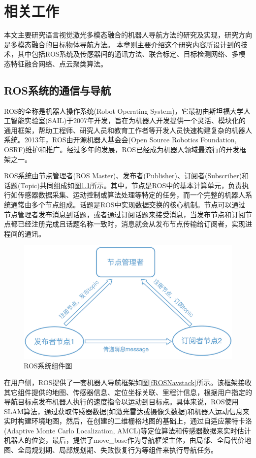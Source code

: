 \chapter{相关工作}

本文主要研究语言视觉激光多模态融合的机器人导航方法的研究及实现，研究方向是多模态融合的目标物体导航方法。
本章则主要介绍这个研究内容所设计到的技术，其中包括ROS系统及传感器间的通讯方法、联合标定、目标检测网络、多模态特征融合网络、点云聚类算法。


\section{ROS系统的通信与导航}
ROS的全称是机器人操作系统(Robot Operating System)，它最初由斯坦福大学人工智能实验室(SAIL)于2007年开发，旨在为机器人开发提供一个灵活、模块化的通用框架，帮助工程师、研究人员和教育工作者等开发人员快速构建复杂的机器人系统。2013年，ROS由开源机器人基金会(Open Source Robotics Foundation, OSRF)维护和推广。经过多年的发展，ROS已经成为机器人领域最流行的开发框架之一。

ROS系统由节点管理者(ROS Master)、发布者(Publisher)、订阅者(Subscriber)和话题(Topic)共同组成如图\ref{frossystem}所示。其中，节点是ROS中的基本计算单元，负责执行如传感器数据采集、运动控制或算法处理等特定的任务，而一个完整的机器人系统通常由多个节点组成。话题是ROS中实现数据交换的核心机制。节点可以通过节点管理者发布消息到话题，或者通过订阅话题来接受消息，当发布节点和订阅节点都已经注册完成且话题名称一致时，消息就会从发布节点传输给订阅者，实现进程间的通讯。

\begin{figure}[htbp]
    \centering
    \includegraphics[scale=0.80]{Fig/rossystem.png}
    \caption{\label{frossystem}ROS系统组件图}
\end{figure}

在用户侧，ROS提供了一套机器人导航框架如图\ref{fROSNavstack}所示。该框架接收其它组件提供的地图、传感器信息、定位坐标关联、里程计信息，根据用户指定的导航目标点发布机器人执行的速度指令以运动到目标点。具体来说，ROS使用SLAM算法，通过获取传感器数据(如激光雷达或摄像头数据)和机器人运动信息来实时构建环境地图，然后，在创建的二维栅格地图的基础上，通过自适应蒙特卡洛(Adaptive Monte Carlo Localization, AMCL)等定位算法和传感器数据来实时估计机器人的位姿，最后，提供了move\_base作为导航框架主体，由局部、全局代价地图、全局规划期、局部规划期、失败恢复行为等组件来执行导航任务。

